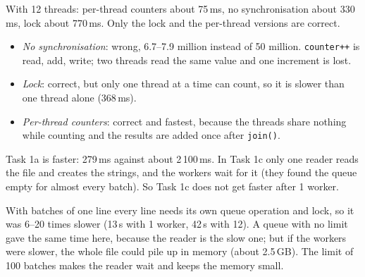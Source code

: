 With 12 threads: per-thread counters about 75\,ms, no synchronisation about 330\,ms, lock about
770\,ms. Only the lock and the per-thread versions are correct.
\begin{itemize}
\item \emph{No synchronisation}: wrong, 6.7--7.9 million instead of 50 million. \texttt{counter++}
is read, add, write; two threads read the same value and one increment is lost.
\item \emph{Lock}: correct, but only one thread at a time can count, so it is slower than one
thread alone (368\,ms).
\item \emph{Per-thread counters}: correct and fastest, because the threads share nothing while
counting and the results are added once after \texttt{join()}.
\end{itemize}

Task 1a is faster: 279\,ms against about 2\,100\,ms. In Task 1c only one reader reads the file
and creates the strings, and the workers wait for it (they found the queue empty for almost every
batch). So Task 1c does not get faster after 1 worker.

With batches of one line every line needs its own queue operation and lock, so it was 6--20 times
slower (13\,s with 1 worker, 42\,s with 12). A queue with no limit gave the same time here, because
the reader is the slow one; but if the workers were slower, the whole file could pile up in memory
(about 2.5\,GB). The limit of 100 batches makes the reader wait and keeps the memory small.
